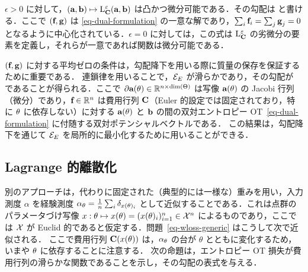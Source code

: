 \begin{proposition}[ヒストグラムに関する導関数]
$\epsilon>0$ に対して，$(\mathrm{\textbf{a}},\mathrm{\textbf{b}}) \mapsto \mathrm{L}_{\mathrm{\textbf{C}}}^\varepsilon(\mathrm{\textbf{a}},\mathrm{\textbf{b}})$ は凸かつ微分可能である．その勾配は
\eql{\label{eq-diff-marginals}
		\nabla \MKD_\C^\epsilon(\a,\b) = (\fD,\gD),
}
と書ける．ここで $(\mathrm{\textbf{f}},\mathrm{\textbf{g}})$ は \eqref{eq-dual-formulation} の一意な解であり，$\sum_i \mathrm{\textbf{f}}_i=\sum_j \mathrm{\textbf{g}}_j=0$ となるように中心化されている．$\epsilon=0$ に対しては，この式は $\mathrm{L}_{\mathrm{\textbf{C}}}^\varepsilon$ の劣微分の要素を定義し，それらが一意であれば関数は微分可能である．
\end{proposition}

$(\mathrm{\textbf{f}},\mathrm{\textbf{g}})$ に対する平均ゼロの条件は，勾配降下を用いる際に質量の保存を保証するために重要である．
%
連鎖律を用いることで，$\mathcal{E}_E$ が滑らかであり，その勾配が
であることが得られる．ここで $\partial \mathrm{\textbf{a}}(\theta) \in \mathbb{R}^{n \times \text{dim}(\Theta)}$ は写像 $\mathrm{\textbf{a}}(\theta)$ の Jacobi 行列（微分）であり，$\mathrm{\textbf{f}} \in \mathbb{R}^n$ は費用行列 $\mathrm{\textbf{C}}$（Euler 的設定では固定されており，特に $\theta$ に依存しない）に対する $\mathrm{\textbf{a}}(\theta)$ と $\mathrm{\textbf{b}}$ の間の双対エントロピー OT~\eqref{eq-dual-formulation} に付随する双対ポテンシャルベクトルである．
%
この結果は，勾配降下を通じて $\mathcal{E}_E$ を局所的に最小化するために用いることができる．

\subsection{Lagrange 的離散化}

別のアプローチは，代わりに固定された（典型的には一様な）重みを用い，入力測度 $\alpha$ を経験測度 $\alpha_\theta = \frac{1}{n}\sum_i \delta_{x(\theta)_i}$ として近似することである．これは点群のパラメータづけ写像 $x : \theta \mapsto x(\theta) = (x(\theta)_i)_{i=1}^n \in \mathcal{X}^n$ によるものであり，ここでは $\mathcal{X}$ が Euclid 的であると仮定する．問題~\eqref{eq-wloss-generic} はこうして次で近似される．
ここで費用行列 $\mathrm{\textbf{C}}(x(\theta))$ は，$\alpha_\theta$ の台が $\theta$ とともに変化するため，いまや $\theta$ に依存することに注意する．
%
次の命題は，エントロピー OT 損失が費用行列の滑らかな関数であることを示し，その勾配の表式を与える．

